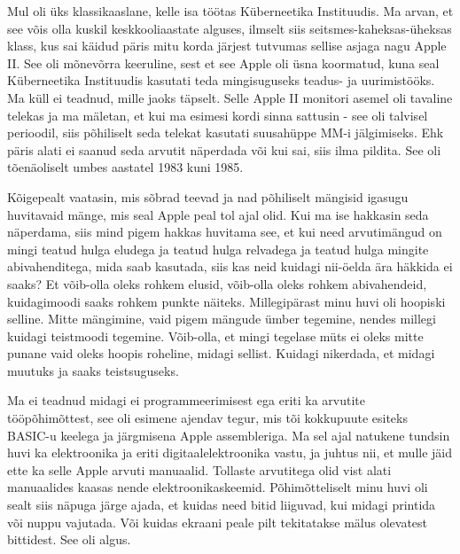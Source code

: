 

Mul oli üks klassikaaslane, kelle isa töötas Küberneetika 
Instituudis. Ma arvan, et see võis olla kuskil 
keskkooliaastate alguses, ilmselt siis seitsmes-kaheksas-üheksas klass, kus sai 
käidud päris mitu korda järjest tutvumas sellise asjaga nagu Apple 
II. See oli  mõnevõrra keeruline, sest et see Apple oli 
üsna koormatud, kuna seal Küberneetika Instituudis  kasutati teda mingisuguseks 
teadus- ja uurimistööks. Ma küll ei teadnud, mille jaoks täpselt. Selle Apple II 
monitori asemel oli tavaline telekas ja ma mäletan, et kui ma 
esimesi kordi sinna sattusin - see oli talvisel perioodil, siis põhiliselt seda 
telekat kasutati suusahüppe MM-i jälgimiseks. Ehk päris alati ei saanud 
seda arvutit näperdada või kui sai, siis ilma pildita. See oli  tõenäoliselt 
umbes aastatel 1983 kuni 1985. 


Kõigepealt vaatasin, mis sõbrad teevad ja nad põhiliselt mängisid igasugu 
huvitavaid mänge, mis seal Apple peal tol ajal olid. Kui ma ise hakkasin seda 
näperdama, siis mind pigem hakkas huvitama see, et kui need arvutimängud on 
mingi teatud hulga eludega ja teatud hulga relvadega ja teatud hulga mingite 
abivahenditega, mida saab kasutada, siis kas neid kuidagi nii-öelda ära häkkida ei 
saaks? Et võib-olla oleks rohkem elusid,  võib-olla oleks rohkem abivahendeid, 
kuidagimoodi saaks rohkem punkte näiteks. Millegipärast minu huvi oli 
hoopiski selline. Mitte  mängimine, vaid pigem mängude ümber 
tegemine, nendes millegi kuidagi teistmoodi tegemine. Võib-olla, et mingi tegelase 
müts ei oleks mitte punane vaid oleks hoopis roheline, midagi sellist. Kuidagi  
nikerdada,  et midagi muutuks ja saaks teistsuguseks. 

Ma ei teadnud midagi ei programmeerimisest ega eriti ka arvutite 
tööpõhimõttest, see oli  esimene ajendav tegur, mis tõi kokkupuute esiteks 
BASIC-u keelega ja järgmisena Apple 
assembleriga. Ma sel ajal natukene tundsin huvi ka 
elektroonika ja eriti digitaalelektroonika vastu, ja juhtus nii, et mulle 
jäid ette ka selle Apple arvuti manuaalid. Tollaste arvutitega olid vist alati 
manuaalides kaasas nende elektroonikaskeemid. Põhimõtteliselt minu huvi oli 
sealt siis  näpuga järge ajada,  et kuidas need bitid liiguvad, kui midagi 
printida või nuppu vajutada. Või kuidas ekraani peale pilt tekitatakse 
mälus olevatest bittidest. See oli algus.

